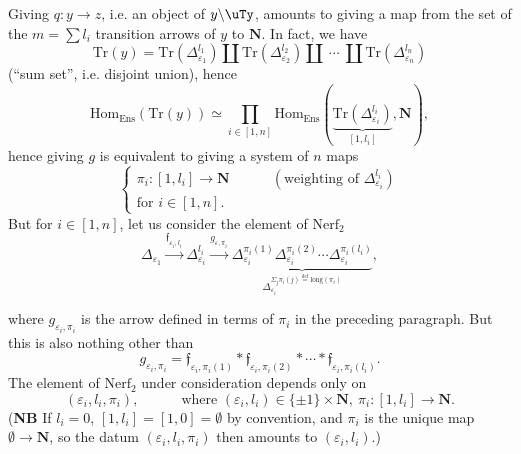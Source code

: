Giving $q : y\longrightarrow z$, i.e. an object of $y\backslash\uTy$, amounts to giving a map from the set of the $m=\sum l_i$ transition arrows of $y$ to $\mathbf{N}$. In fact, we have %
\[
\mathrm{Tr}(y) = \mathrm{Tr}(\Delta^{l_1}_{\varepsilon_1})\amalg\mathrm{Tr}(\Delta^{l_2}_{\varepsilon_2})\amalg\ \cdots\ \amalg\mathrm{Tr}(\Delta^{l_n}_{\varepsilon_n})
\]
(``sum set'', i.e. disjoint union), hence
\[
\mathrm{Hom}_{\mathrm{Ens}}(\mathrm{Tr}(y)) \simeq \prod_{i\in[1,n]}\mathrm{Hom}_{\mathrm{Ens}}(\underbrace{\mathrm{Tr}(\Delta^{l_i}_{\varepsilon_i})}_{[1,l_i]},\mathbf{N}), %
\]
hence giving $g$ is equivalent to giving a system of $n$ maps
\[
\left\{
\begin{array}{l}
\pi_i : [1,l_i]\longrightarrow\mathbf{N} \qquad\quad (\text{weighting of }\Delta^{l_i}_{\varepsilon_i})\\[6pt]
\text{for } i\in[1,n].
\end{array}
\right.
\]
But for $i\in[1,n]$, let us consider the element of $\mathrm{Nerf}_2$
\[
\Delta_{\varepsilon_1}\xrightarrow{\mathfrak{f}_{\varepsilon_i,l_i}}\Delta^{l_i}_{\varepsilon_i}\xrightarrow{g_{\varepsilon,\pi_i}}\underbrace{\Delta^{\pi_i(1)}_{\varepsilon_i}\Delta^{\pi_i(2)}_{\varepsilon_i}\cdots\Delta^{\pi_i(l_i)}_{\varepsilon_i}}_{\Delta_{\varepsilon_i}^{\Sigma_j\pi_i(j)\overset{\text{def}}{=}\mathrm{long}(\pi_i)}}, %
\tag*{(1)}
\]

where $g_{\varepsilon_i,\pi_i}$ is the arrow defined in terms of $\pi_i$ in the preceding paragraph. But this is also nothing other than
\[
g_{\varepsilon_i,\pi_i} = \mathfrak{f}_{\varepsilon_i,\pi_i(1)}*\mathfrak{f}_{\varepsilon_i,\pi_i(2)}*\cdots*\mathfrak{f}_{\varepsilon_i,\pi_i(l_i)}.
\tag*{(2)}
\]
The element of $\mathrm{Nerf}_2$ under consideration depends only on
\[
(\varepsilon_i,l_i,\pi_i), \qquad\quad \text{where } (\varepsilon_i,l_i)\in\{\pm1\}\times\mathbf{N},\ \pi_i : [1,l_i]\longrightarrow\mathbf{N}.
\]
(\textbf{NB} If $l_i=0$, $[1,l_i]=[1,0]=\emptyset$ by convention, and $\pi_i$ is the unique map $\emptyset\longrightarrow\mathbf{N}$, so the datum $(\varepsilon_i,l_i,\pi_i)$ then amounts to $(\varepsilon_i,l_i)$.)

